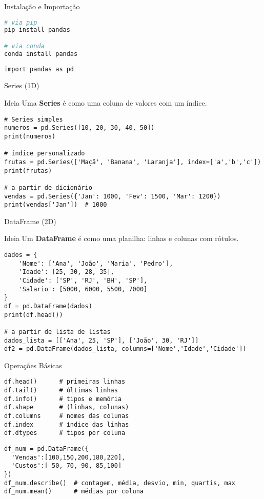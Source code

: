 \documentclass[aspectratio=169]{beamer}
\begin{document}
\begin{frame}[fragile]{Instalação e Importação}
\begin{lstlisting}[language=sh]
# via pip
pip install pandas

# via conda
conda install pandas
\end{lstlisting}
\vspace{0.4em}
\begin{lstlisting}
import pandas as pd
\end{lstlisting}
\end{frame}

\begin{frame}[fragile]{Series (1D)}
  \begin{block}{Ideia}
    Uma \textbf{Series} é como uma coluna de valores com um índice.
  \end{block}
\begin{lstlisting}
# Series simples
numeros = pd.Series([10, 20, 30, 40, 50])
print(numeros)

# índice personalizado
frutas = pd.Series(['Maçã', 'Banana', 'Laranja'], index=['a','b','c'])
print(frutas)

# a partir de dicionário
vendas = pd.Series({'Jan': 1000, 'Fev': 1500, 'Mar': 1200})
print(vendas['Jan'])  # 1000
\end{lstlisting}
\end{frame}

\begin{frame}[fragile]{DataFrame (2D)}
  \begin{block}{Ideia}
    Um \textbf{DataFrame} é como uma planilha: linhas e colunas com rótulos.
  \end{block}
\begin{lstlisting}
dados = {
    'Nome': ['Ana', 'João', 'Maria', 'Pedro'],
    'Idade': [25, 30, 28, 35],
    'Cidade': ['SP', 'RJ', 'BH', 'SP'],
    'Salario': [5000, 6000, 5500, 7000]
}
df = pd.DataFrame(dados)
print(df.head())

# a partir de lista de listas
dados_lista = [['Ana', 25, 'SP'], ['João', 30, 'RJ']]
df2 = pd.DataFrame(dados_lista, columns=['Nome','Idade','Cidade'])
\end{lstlisting}
\end{frame}

\begin{frame}[fragile]{Operações Básicas}
\begin{lstlisting}
df.head()      # primeiras linhas
df.tail()      # últimas linhas
df.info()      # tipos e memória
df.shape       # (linhas, colunas)
df.columns     # nomes das colunas
df.index       # índice das linhas
df.dtypes      # tipos por coluna
\end{lstlisting}
\vspace{0.4em}
\begin{lstlisting}
df_num = pd.DataFrame({
  'Vendas':[100,150,200,180,220],
  'Custos':[ 50, 70, 90, 85,100]
})
df_num.describe()  # contagem, média, desvio, min, quartis, max
df_num.mean()      # médias por coluna
\end{lstlisting}
\end{frame}
\end{document}
